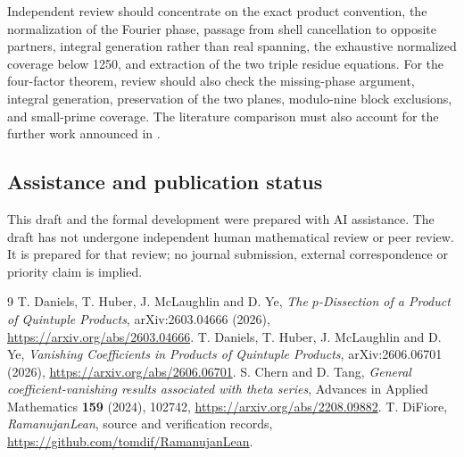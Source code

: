 \documentclass[11pt]{amsart}
\theoremstyle{definition}
\begin{document}
Independent review should concentrate on the exact product convention,
the normalization of the Fourier phase, passage from shell cancellation
to opposite partners, integral generation rather than real spanning,
the exhaustive normalized coverage below 1250, and extraction of the
two triple residue equations. For the four-factor theorem, review should
also check the missing-phase argument, integral generation, preservation
of the two planes, modulo-nine block exclusions, and small-prime coverage.
The literature comparison must also account for
the further work announced in \cite{vanishing}.

\subsection*{Assistance and publication status}
This draft and the formal development were prepared with AI assistance.
The draft has not undergone independent human mathematical review or
peer review. It is prepared for that review; no journal submission,
external correspondence or priority claim is implied.

\begin{thebibliography}{9}
T. Daniels, T. Huber, J. McLaughlin and D. Ye,
\emph{The $p$-Dissection of a Product of Quintuple Products},
arXiv:2603.04666 (2026),
\url{https://arxiv.org/abs/2603.04666}.
T. Daniels, T. Huber, J. McLaughlin and D. Ye,
\emph{Vanishing Coefficients in Products of Quintuple Products},
arXiv:2606.06701 (2026),
\url{https://arxiv.org/abs/2606.06701}.
S. Chern and D. Tang,
\emph{General coefficient-vanishing results associated with theta series},
Advances in Applied Mathematics \textbf{159} (2024), 102742,
\url{https://arxiv.org/abs/2208.09882}.
T. DiFiore, \emph{RamanujanLean}, source and verification records,
\url{https://github.com/tomdif/RamanujanLean}.
\end{thebibliography}
\end{document}
